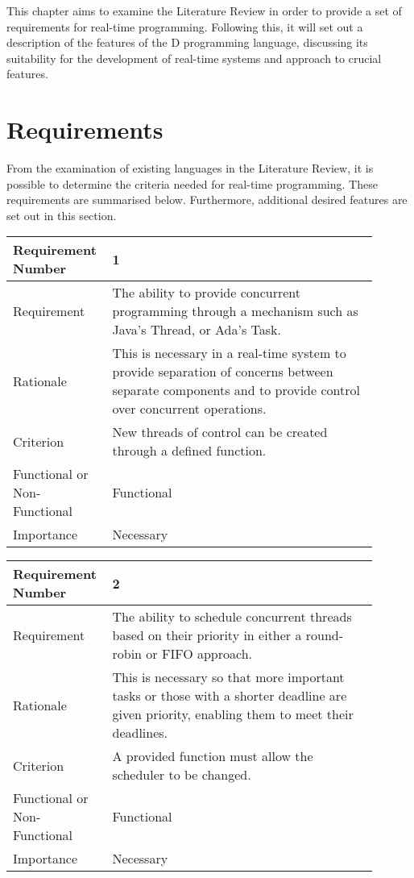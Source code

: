 
This chapter aims to examine the Literature Review in order to provide a set of 
requirements for real-time programming. Following this, it will set out a 
description of the features of the D programming language, discussing its 
suitability for the development of real-time systems and approach to crucial 
features.

\section{Requirements}
From the examination of existing languages in the Literature Review, it is possible 
to determine the criteria needed for real-time programming. These requirements are 
summarised below. Furthermore, additional desired features are set out 
in this section. 
\begin{table}[!htbp]
\centering
\begin{tabular}{|L{0.2\linewidth}|L{0.7\linewidth}|}
\hline
Requirement Number & 1 \\ \hline
Requirement & The ability to provide concurrent programming through a 
mechanism such as Java's Thread, or Ada's Task. \\ \hline
Rationale      & This is necessary in a real-time system to provide separation 
of concerns between separate components and to  provide control over 
concurrent operations. \\ \hline
Criterion      & New threads of control can be created through a defined 
function. \\ \hline
Functional or Non-Functional & Functional \\ \hline
Importance     & Necessary \\ \hline
\end{tabular}
\end{table}
\begin{table}[!htbp]
\centering
\begin{tabular}{|L{0.2\linewidth}|L{0.7\linewidth}|}
\hline
Requirement Number & 2 \\ \hline
Requirement & The ability to schedule concurrent threads based on their priority in 
                either a round-robin or FIFO approach.\\ \hline
Rationale      & This is necessary so that more important tasks or those with a shorter deadline
                are given priority, enabling them to meet their 
                deadlines. \\ \hline
Criterion      & A provided function must allow the scheduler to be changed. \\ \hline
Functional or Non-Functional & Functional \\ \hline
Importance     & Necessary \\ \hline
\end{tabular}
\end{table}
